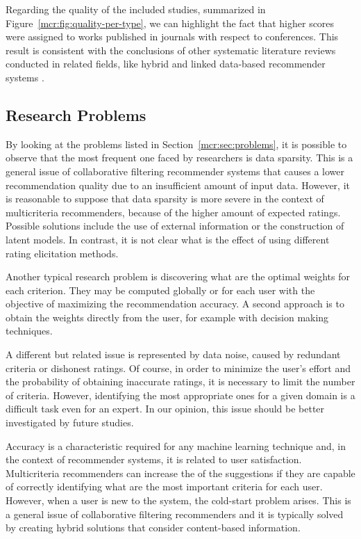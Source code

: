 Regarding the quality of the included studies, summarized in Figure~\ref{mcr:fig:quality-per-type}, we can highlight the fact that higher scores were assigned to works published in journals with respect to conferences. This result is consistent with the conclusions of other systematic literature reviews conducted in related fields, like hybrid and linked data-based recommender systems \cite{Cano2017,Figueroa2015}.

\subsection{Research Problems}

By looking at the problems listed in Section~\ref{mcr:sec:problems}, it is possible to observe that the most frequent one faced by researchers is data sparsity. This is a general issue of collaborative filtering recommender systems that causes a lower recommendation quality due to an insufficient amount of input data. However, it is reasonable to suppose that data sparsity is more severe in the context of multicriteria recommenders, because of the higher amount of expected ratings. Possible solutions include the use of external information or the construction of latent models. In contrast, it is not clear what is the effect of using different rating elicitation methods.

Another typical research problem is discovering what are the optimal weights for each criterion. They may be computed globally or for each user with the objective of maximizing the recommendation accuracy. A second approach is to obtain the weights directly from the user, for example with decision making techniques.

A different but related issue is represented by data noise, caused by redundant criteria or dishonest ratings. Of course, in order to minimize the user's effort and the probability of obtaining inaccurate ratings, it is necessary to limit the number of criteria. However, identifying the most appropriate ones for a given domain is a difficult task even for an expert. In our opinion, this issue should be better investigated by future studies.

Accuracy is a characteristic required for any machine learning technique and, in the context of recommender systems, it is related to user satisfaction. Multicriteria recommenders can increase the  of the suggestions if they are capable of correctly identifying what are the most important criteria for each user. However, when a user is new to the system, the cold-start problem arises. This is a general issue of collaborative filtering recommenders and it is typically solved by creating hybrid solutions that consider content-based information.

